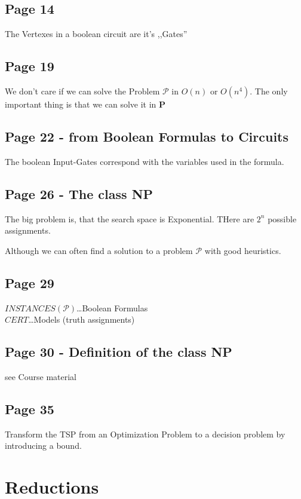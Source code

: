\documentclass[a4paper]{article}
\begin{document}
\subsection{Page 14}
The Vertexes in a boolean circuit are it's ,,Gates''\\

\subsection{Page 19}
We don't care if we can solve the Problem $\mathcal{P}$ in $O(n)$ or $O(n^4)$.
The only important thing is that we can solve it in \textbf{P}

\subsection{Page 22  - from Boolean Formulas to Circuits}
The boolean Input-Gates correspond with the variables used in the formula.

\subsection{Page 26 - The class NP}
The big problem is, that the search space is Exponential.
THere are $2^n$ possible assignments.

Although we can often find a solution to a problem $\mathcal{P}$ with good
heuristics.

\subsection{Page 29}
$INSTANCES(\mathcal{P})$\ldots Boolean Formulas\\
$CERT$\ldots Models (truth assignments)

\subsection{Page 30 - Definition of the class NP}
see Course material

\subsection{Page 35}
Transform the TSP from an Optimization Problem to a decision problem by
introducing a bound.



\section{Reductions}
\end{document}
